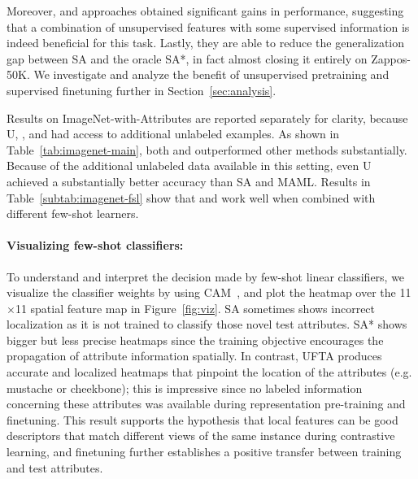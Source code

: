 Moreover, \uftsa{} and \uftpn{} approaches obtained significant gains in
performance, suggesting that a combination of unsupervised features with some
supervised information is indeed beneficial for this task. Lastly, they
are able to reduce the generalization gap between SA and the oracle SA*, in
fact almost closing it entirely on Zappos-50K. We investigate and analyze the benefit of unsupervised pretraining and supervised finetuning further in Section~\ref{sec:analysis}.

Results on ImageNet-with-Attributes are reported separately for clarity,
because U, \uftpn{}, and \uftsa{} had access to additional unlabeled examples.
As shown in Table~\ref{tab:imagenet-main}, both \uftpn{} and \uftsa{}
outperformed other methods substantially. Because of the additional unlabeled
data available in this setting, even U achieved a substantially better accuracy
than SA and MAML. Results in Table~\ref{subtab:imagenet-fsl} show that \uftpn{}
and \uftsa{} work well when combined with different few-shot learners.

\savespacebeforesection
{}
\paragraph{Visualizing few-shot classifiers:} To understand and interpret the
decision made by few-shot linear classifiers, we visualize the classifier
weights by using CAM~\citep{cam}, and plot the heatmap over the 11$\times$11
spatial feature map in Figure~\ref{fig:viz}. SA sometimes shows incorrect
localization as it is not trained to classify those novel test attributes. SA*
shows bigger but less precise heatmaps since the training objective encourages
the propagation of attribute information spatially. In contrast, UFTA produces
accurate and localized heatmaps that pinpoint the location of the attributes
(e.g. mustache or cheekbone); this is impressive since no labeled information
concerning these attributes was available during representation pre-training
and finetuning. This result supports the hypothesis that local features can be
good descriptors that match different views of the same instance during
contrastive learning, and finetuning further establishes a positive transfer
between training and test attributes.

\savespacebeforesection
